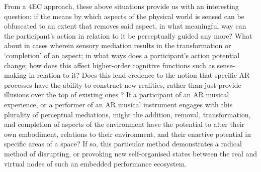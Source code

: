 From a 4EC approach, these above situations provide us with an interesting question: if the means by which aspects of the physical world is sensed can be obfuscated to an extent that removes said aspect, in what meaningful way can the participant's action in relation to it be perceptually guided any more? What about in cases wherein sensory mediation results in the transformation or `completion' of an aspect; in what ways does a participant's action potential change; how does this affect higher-order cognitive functions such as sense-making in relation to it? Does this lend credence to the notion that specific AR processes have the ability to construct new realities, rather than just provide illusions over the top of existing ones \citep[p. 230]{chalmers2022}? If a participant of an AR musical experience, or a performer of an AR musical instrument engages with this plurality of perceptual mediations, might the addition, removal, transformation, and completion of aspects of the environment have the potential to alter their own embodiment, relations to their environment, and their enactive potential in specific areas of a space? If so, this particular method demonstrates a radical method of disrupting, or provoking new self-organised states between the real and virtual nodes of such an embedded performance ecosystem.

